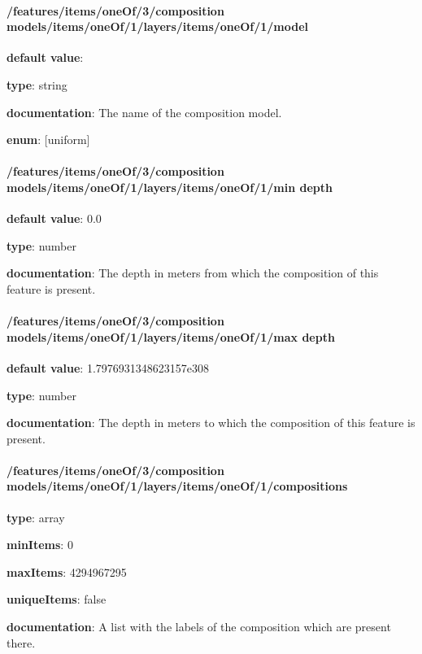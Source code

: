 \paragraph{/features/items/oneOf/3/composition models/items/oneOf/1/layers/items/oneOf/1/model} \begin{itemized}
\item {\bf default value}: 
\item {\bf type}: string
\item {\bf documentation}: The name of the composition model.
\item {\bf enum}: [uniform]\end{itemized}\paragraph{/features/items/oneOf/3/composition models/items/oneOf/1/layers/items/oneOf/1/min depth} \begin{itemized}
\item {\bf default value}: 0.0
\item {\bf type}: number
\item {\bf documentation}: The depth in meters from which the composition of this feature is present.
\end{itemized}\paragraph{/features/items/oneOf/3/composition models/items/oneOf/1/layers/items/oneOf/1/max depth} \begin{itemized}
\item {\bf default value}: 1.7976931348623157e308
\item {\bf type}: number
\item {\bf documentation}: The depth in meters to which the composition of this feature is present.
\end{itemized}\paragraph{/features/items/oneOf/3/composition models/items/oneOf/1/layers/items/oneOf/1/compositions} \begin{itemized}
\item {\bf type}: array
\item {\bf minItems}: 0
\item {\bf maxItems}: 4294967295
\item {\bf uniqueItems}: false
\item {\bf documentation}: A list with the labels of the composition which are present there.

\end{itemized}
